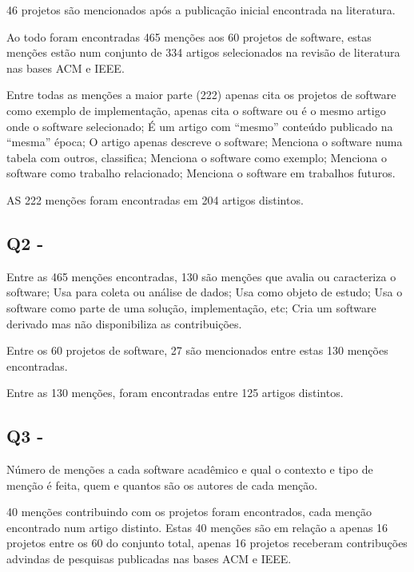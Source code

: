 46 projetos são mencionados após a publicação inicial encontrada na literatura.

Ao todo foram encontradas 465 menções aos 60 projetos de software, estas
menções estão num conjunto de 334 artigos selecionados na revisão de literatura
nas bases ACM e IEEE.



Entre todas as menções a maior parte (222) apenas cita os projetos de software
como exemplo de implementação, apenas cita o software ou é o mesmo artigo onde
o software selecionado; É um artigo com “mesmo” conteúdo publicado na “mesma”
época; O artigo apenas descreve o software; Menciona o software numa tabela com
outros, classifica; Menciona o software como exemplo; Menciona o software como
trabalho relacionado; Menciona o software em trabalhos futuros.


AS 222 menções foram encontradas em 204 artigos distintos.

\subsection{Q2 - \EstudoDoisQuestaoDois}

Entre as 465 menções encontradas, 130 são menções que avalia ou caracteriza o
software; Usa para coleta ou análise de dados; Usa como objeto de estudo; Usa o
software como parte de uma solução, implementação, etc; Cria um software
derivado mas não disponibiliza as contribuições.

Entre os 60 projetos de software, 27 são mencionados entre estas 130 menções
encontradas.


Entre as 130 menções, foram encontradas entre 125 artigos distintos.

\subsection{Q3 - \EstudoDoisQuestaoTres}

Número de menções a cada software acadêmico e qual o contexto e tipo de menção
é feita, quem e quantos são os autores de cada menção.


40 menções contribuindo com os projetos foram encontrados, cada menção
encontrado num artigo distinto. Estas 40 menções são em relação a apenas
16 projetos entre os 60 do conjunto total, apenas 16 projetos receberam
contribuções advindas de pesquisas publicadas nas bases ACM e IEEE.

